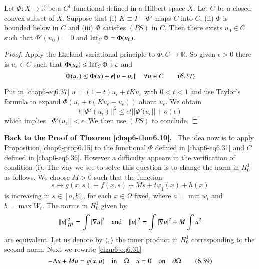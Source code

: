 \begin{proposition}\label{chap6-prop6.15}
Let $\Phi:X\to \mathbb{R}$ be a $C^{1}$ functional defined in a
Hilbert space $X$. Let $C$ be a closed convex subset of $X$. Suppose
that {\rm(i)} $K\equiv I-\Phi'$ maps $C$ into $C$, {\rm(ii)} $\Phi$ is
bounded below in $C$ and {\rm(iii)} $\Phi$ satisfies $(PS)$ in
$C$. Then there exists $u_{0}\in C$ such that $\Phi'(u_{0})=0$ and
$\operatorname{Inf}_{C}\Phi=\Phi(u_{0})$. 
\end{proposition}

\begin{proof}
Apply the Ekeland variational principle to $\Phi:C\to \mathbb{R}$. So
given $\epsilon>0$ there is $u_{\epsilon}\in C$ such that
$\Phi(u_{\epsilon})\leq \operatorname{Inf}_{C}\Phi+\epsilon$ and 
\begin{equation*}
\Phi(u_{\epsilon})\leq \Phi(u)+\epsilon||u-u_{\epsilon}||\quad \forall
u\in C\tag{6.37}\label{chap6-eq6.37}
\end{equation*}

Put in \eqref{chap6-eq6.37} $u=(1-t)u_{\epsilon}+tKu_{\epsilon}$ with
$0<t<1$ and use Taylor's formula to expand
$\Phi(u_{\epsilon}+t(Ku_{\epsilon}-u_{\epsilon}))$ about
$u_{\epsilon}$. We obtain
$$
t||\Phi'(u_{\epsilon})||^{2}\leq \epsilon t||\Phi'(u_{\epsilon}||+o(t)
$$
which implies $||\Phi'(u_{\epsilon}||<\epsilon$. We then use $(PS)$ to
conclude. 
\end{proof}

\noindent
{\bf Back to the Proof of Theorem \ref{chap6-thm6.10}.}~ The idea now
is to apply Proposition \ref{chap6-prop6.15} to the functional $\Phi$
defined in \eqref{chap6-eq6.31} and $C$ defined in
\eqref{chap6-eq6.36}. However a difficulty appears in the verification
of condition (i). The way we see to solve this question is to change
the norm in $H^{1}_{0}$ as follows. We choose $M>0$ such that the
function
\begin{equation*}
s\mapsto g(x,s)\equiv
f(x,s)+Ms+t\varphi_{1}(x)+h(x)\tag{6.38}\label{chap6-eq6.38} 
\end{equation*}
is increasing in $s\in [a,b]$, for each $x\in \overline{\Omega}$
fixed, where $a=\min w_{t}$ and $b=\max W_{t}$. The norms in
$H^{1}_{0}$ given by
$$
||u||^{2}_{H^{1}}=\int |\nabla u|^{2}\quad\text{and}\quad ||u||^{2}=\int
|\nabla u|^{2}+M\int u^{2} 
$$
are equivalent. Let us denote by $\langle , \rangle$ the inner product
in $H^{1}_{0}$ corresponding to the second norm. Next we rewrite
\eqref{chap6-eq6.31} 
\begin{equation*}
-\Delta u+Mu=g(x,u)\quad\text{in}\quad \Omega\quad u=0\quad\text{on}\quad \partial
\Omega\tag{6.39}\label{chap6-eq6.39} 
\end{equation*}

